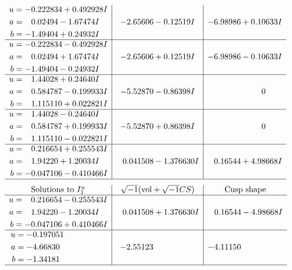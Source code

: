 \documentclass[1p]{elsarticle_modified}
\theoremstyle{definition}
\newcommand{\I}{\sqrt{-1}}
\begin{document}
$$\begin{array}{c|c|c}
\begin{aligned}
u &= -0.222834 + 0.492928 I \\
a &= \phantom{-}0.02494 - 1.67474 I \\
b &= -1.49404 + 0.24932 I\end{aligned}
 & -2.65606 - 0.12519 I & -6.98986 + 0.10633 I \\ \hline\begin{aligned}
u &= -0.222834 - 0.492928 I \\
a &= \phantom{-}0.02494 + 1.67474 I \\
b &= -1.49404 - 0.24932 I\end{aligned}
 & -2.65606 + 0.12519 I & -6.98986 - 0.10633 I \\ \hline\begin{aligned}
u &= \phantom{-}1.44028 + 0.24640 I \\
a &= \phantom{-}0.584787 - 0.199933 I \\
b &= \phantom{-}1.115110 + 0.022821 I\end{aligned}
 & -5.52870 - 0.86398 I & \phantom{-0.000000 } 0 \\ \hline\begin{aligned}
u &= \phantom{-}1.44028 - 0.24640 I \\
a &= \phantom{-}0.584787 + 0.199933 I \\
b &= \phantom{-}1.115110 - 0.022821 I\end{aligned}
 & -5.52870 + 0.86398 I & \phantom{-0.000000 } 0 \\ \hline\begin{aligned}
u &= \phantom{-}0.216654 + 0.255543 I \\
a &= \phantom{-}1.94220 + 1.20034 I \\
b &= -0.047106 - 0.410466 I\end{aligned}
 & \phantom{-}0.041508 - 1.376630 I & \phantom{-}0.16544 + 4.98668 I\\
 \hline 
 \end{array}$$\newpage$$\begin{array}{c|c|c}  
\text{Solutions to }I^u_{1}& \I (\text{vol} + \sqrt{-1}CS) & \text{Cusp shape}\\
 \hline 
\begin{aligned}
u &= \phantom{-}0.216654 - 0.255543 I \\
a &= \phantom{-}1.94220 - 1.20034 I \\
b &= -0.047106 + 0.410466 I\end{aligned}
 & \phantom{-}0.041508 + 1.376630 I & \phantom{-}0.16544 - 4.98668 I \\ \hline\begin{aligned}
u &= -0.197051\phantom{ +0.000000I} \\
a &= -4.66830\phantom{ +0.000000I} \\
b &= -1.34181\phantom{ +0.000000I}\end{aligned}
 & -2.55123\phantom{ +0.000000I} & -4.11150\phantom{ +0.000000I}\\
 \hline 
 \end{array}$$\newpage\newpage\renewcommand{\arraystretch}{1}
\end{document}
